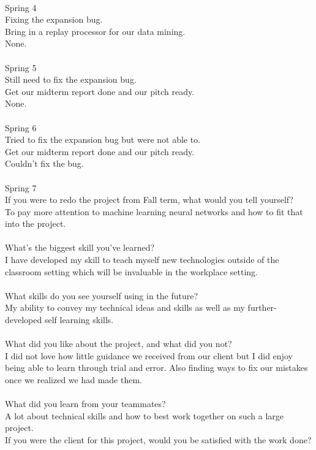 \\
Spring 4\\
Fixing the expansion bug.\\ Bring in a replay processor for our data mining.\\ None.\\
\\
Spring 5\\
Still need to fix the expansion bug.\\ Get our midterm report done and our pitch ready.\\ None.\\
\\
Spring 6\\
Tried to fix the expansion bug but were not able to.\\ Get our midterm report done and our pitch ready.\\ Couldn't fix the bug.\\
\\
Spring 7\\
If you were to redo the project from Fall term, what would you tell yourself?\\
To pay more attention to machine learning neural networks and how to fit that into the project.\\
\\
What's the biggest skill you've learned?\\
I have developed my skill to teach myself new technologies outside of the classroom setting which will be invaluable in the workplace setting.\\
\\
What skills do you see yourself using in the future?\\
My ability to convey my technical ideas and skills as well as my further-developed self learning skills.\\
\\
What did you like about the project, and what did you not?\\
I did not love how little guidance we received from our client but I did enjoy being able to learn through trial and error. Also finding ways to fix our mistakes once we realized we had made them.\\
\\
What did you learn from your teammates?\\
A lot about technical skills and how to best work together on such a large project.
\\
If you were the client for this project, would you be satisfied with the work done?\\
